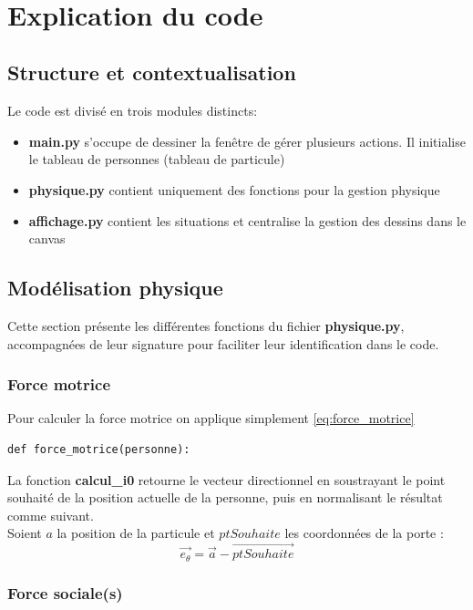 \documentclass[a4paper,12pt]{article}
\begin{document}
\
\section{Explication du code}
\subsection{Structure et contextualisation}
\noindent Le code est divisé en trois modules distincts:
\begin{itemize}
	\item \textbf{main.py} s'occupe de dessiner la fenêtre de gérer plusieurs actions. Il initialise le tableau de personnes (tableau de particule)
	
	\item \textbf{physique.py} contient uniquement des fonctions pour la gestion physique
	
	\item \textbf{affichage.py} contient les situations et centralise la gestion des dessins dans le canvas
\end{itemize}

\subsection{Modélisation physique}
Cette section présente les différentes fonctions du fichier \textbf{physique.py}, accompagnées de leur signature pour faciliter leur identification dans le code.
\subsubsection{Force motrice}

Pour calculer la force motrice on applique simplement \eqref{eq:force_motrice}

\begin{verbatim}
def force_motrice(personne):
\end{verbatim}

La fonction \textbf{calcul\_i0} retourne le vecteur directionnel en soustrayant le point souhaité de la position actuelle de la personne, puis en normalisant le résultat comme suivant.
\\
\indent Soient $a$ la position de la particule et $ptSouhaite$ les coordonnées de la porte :
\begin{equation}
	\vec{e_\theta} = \vec{a} - \vec{ptSouhaite}
\end{equation}


\subsubsection{Force sociale(s)}
\end{document}
